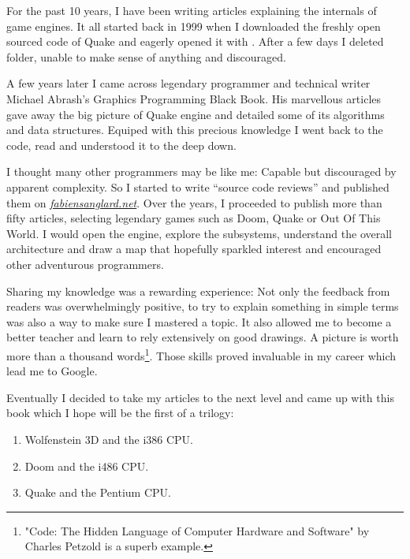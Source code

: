\documentclass[book.tex]{subfiles}
\begin{document}
For the past 10 years, I have been writing articles explaining the internals of game engines. It all started back in 1999 when I downloaded the freshly open sourced code of \mbox{Quake} and eagerly opened it with . After a few days I deleted  folder, unable to make sense of anything and discouraged.

\bigskip

A few years later I came across legendary programmer and technical writer Michael Abrash's Graphics Programming Black Book. His marvellous articles gave away the big picture of Quake engine and detailed some of its algorithms and data structures. Equiped with this precious knowledge I went back to the code, read and understood it to the deep down.

\bigskip

I thought many other programmers may be like me: Capable but discouraged by apparent complexity. So I started to write ``source  code reviews'' and published them on 
\href{http://fabiensanglard.net}{\textit{fabiensanglard.net}}. Over the years, I proceeded to publish more than fifty articles, selecting legendary games such as Doom, Quake or Out Of This World. I would open the engine, explore the subsystems, understand the overall architecture and draw a map that hopefully sparkled interest and encouraged other adventurous programmers.

\bigskip

Sharing my knowledge was a rewarding experience: Not only the feedback from readers was overwhelmingly positive, to try to explain something in simple terms was also a way to make sure I mastered a topic. It also allowed me to become a better teacher and learn to rely extensively on good drawings. A picture
is worth more than a thousand words\footnote{"Code: The Hidden Language of Computer Hardware and Software" by Charles Petzold is a superb example.}. Those skills proved invaluable in my career which lead me to Google.

\bigskip

Eventually I decided to take my articles to the next level and came up with this book which I hope will be the first of a trilogy:

\begin{enumerate}
\item Wolfenstein 3D and the i386 CPU.
\item Doom and the i486 CPU.
\item Quake and the Pentium CPU.
\end{enumerate}
\end{document}
